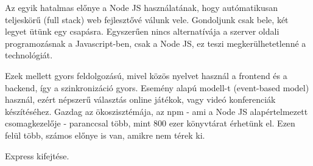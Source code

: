 Az egyik hatalmas előnye a Node JS használatának, hogy autómatikusan teljeskörű (full stack) web fejlesztővé válunk vele. Gondoljunk csak bele, két legyet ütünk egy csapásra. Egyszerűen nincs alternatívája a szerver oldali programozásnak a Javascript-ben, csak a Node JS, ez teszi megkerülhetetlenné a technológiát.

Ezek mellett gyors feldolgozású, mivel közös nyelvet használ a frontend és a backend, így a szinkronizáció gyors. Esemény alapú modell-t (event-based model) használ, ezért népszerű választás online játékok, vagy videó konferenciák készítéséhez. Gazdag az ökoszisztémája, az npm - ami a Node JS alapértelmezett csomagkezelője - paranccsal több, mint 800 ezer könyvtárat érhetünk el. Ezen felül több, számos előnye is van, amikre nem térek ki.

Express kifejtése.